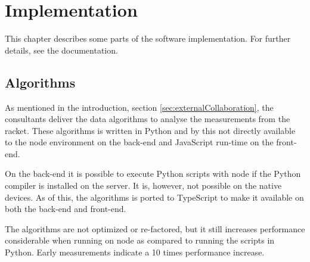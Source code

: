 \chapter{Implementation}
This chapter describes some parts of the software implementation.
For further details, see the documentation.

\section{Algorithms}
As mentioned in the introduction, section \ref{sec:externalCollaboration}, the consultants deliver the data algorithms to analyse the measurements from the racket.
These algorithms is written in Python and by this not directly available to the \gls{node} environment on the back-end and JavaScript run-time on the front-end.

On the back-end it is possible to execute Python scripts with \gls{node} if the Python compiler is installed on the server.
It is, however, not possible on the native devices.
As of this, the algorithms is ported to TypeScript to make it available on both the back-end and front-end.

The algorithms are not optimized or re-factored, but it still increases performance considerable when running on \gls{node} as compared to running the scripts in Python.
Early measurements indicate a 10 times performance increase.
